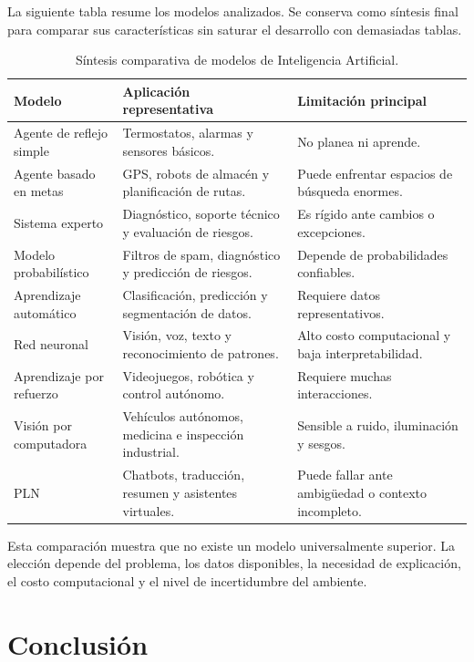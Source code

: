 La siguiente tabla resume los modelos analizados. Se conserva como síntesis final para comparar sus características sin saturar el desarrollo con demasiadas tablas.

\begin{table}[h!]
\centering
\small
\renewcommand{\arraystretch}{1.25}
\begin{tabularx}{\textwidth}{L{3.1cm} Y Y}
\toprule
\textbf{Modelo} & \textbf{Aplicación representativa} & \textbf{Limitación principal} \\
\midrule
Agente de reflejo simple & Termostatos, alarmas y sensores básicos. & No planea ni aprende. \\
Agente basado en metas & GPS, robots de almacén y planificación de rutas. & Puede enfrentar espacios de búsqueda enormes. \\
Sistema experto & Diagnóstico, soporte técnico y evaluación de riesgos. & Es rígido ante cambios o excepciones. \\
Modelo probabilístico & Filtros de spam, diagnóstico y predicción de riesgos. & Depende de probabilidades confiables. \\
Aprendizaje automático & Clasificación, predicción y segmentación de datos. & Requiere datos representativos. \\
Red neuronal & Visión, voz, texto y reconocimiento de patrones. & Alto costo computacional y baja interpretabilidad. \\
Aprendizaje por refuerzo & Videojuegos, robótica y control autónomo. & Requiere muchas interacciones. \\
Visión por computadora & Vehículos autónomos, medicina e inspección industrial. & Sensible a ruido, iluminación y sesgos. \\
PLN & Chatbots, traducción, resumen y asistentes virtuales. & Puede fallar ante ambigüedad o contexto incompleto. \\
\bottomrule
\end{tabularx}
\caption{Síntesis comparativa de modelos de Inteligencia Artificial.}
\label{tab:comparacion}
\end{table}

Esta comparación muestra que no existe un modelo universalmente superior. La elección depende del problema, los datos disponibles, la necesidad de explicación, el costo computacional y el nivel de incertidumbre del ambiente.

\section{Conclusión}


